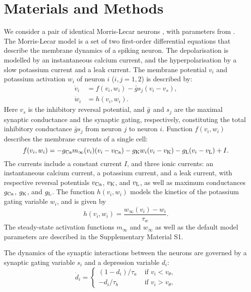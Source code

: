 \section{Materials and Methods}
We consider a pair of identical Morris-Lecar neurons \citep{morris1981}, with parameters from \cite{bose2011}.
The Morris-Lecar model is a set of two first-order differential equations that describe the membrane dynamics of a spiking neuron.
The depolarisation is modelled by an instantaneous calcium current, and the hyperpolarisation by a slow potassium current and a leak current.
The membrane potential $v_{i}$ and potassium activation $w_{i}$ of neuron $i$ ($i, j=1,2$) is described by:
\begin{align}
	\label{eq:cell-modelA}
	\dot v_{i} & = f(v_{i}, w_{i}) -\bar g s_j(v_i-v_{s}), \\
	\label{eq:cell-modelB}
	\dot w_{i} & =h(v_i,w_i).
\end{align}
Here $v_{s}$ is the inhibitory reversal potential, and $\bar g$ and $s_{j}$ are the maximal synaptic conductance and the synaptic gating, respectively, constituting the total inhibitory conductance $\bar g s_{j}$ from neuron $j$ to neuron $i$.
Function $f(v_{i}, w_{i})$ describes the membrane currents of a single cell:
\begin{equation}
	\label{eq:f}
	f(v_{i}, w_{i}) = -g_{\mathrm{Ca}}m_{\infty}(v_{i})(v_{i}-v_{\mathrm{Ca}}) - g_{\mathrm{K}}w_{i}(v_{i}-v_{\mathrm{K}})
	-g_{\mathrm{L}}(v_{i}-v_{\mathrm{L}}) + I.
\end{equation}
The currents include a constant current $I$, and three ionic currents: an instantaneous calcium current, a potassium current, and a leak current, with respective reversal
potentials $v_{\mathrm{Ca}}$, $v_{\mathrm{K}}$, and $v_{\mathrm{L}}$, as well as maximum conductances
$g_{\mathrm{Ca}}$, $g_{\mathrm{K}}$, and $g_{\mathrm{L}}$.  The function $h(v_{i}, w_{i})$ models the
kinetics of the potassium gating variable $w_{i}$, and is given by
\begin{equation}
	\label{eq:h}
	h(v_{i}, w_{i})=\frac{w_{\infty}(v_{i})-w_{i}}{\tau_{w}}.
\end{equation}
The steady-state activation functions $m_{\infty}$ and $w_{\infty}$ as well as the default model parameters are described in the Supplementary Material S1.

The dynamics of the synaptic interactions between the neurons are governed by a synaptic gating variable $s_{i}$ and a depression variable $d_{i}$:
\begin{equation}
	\label{eq:dot-d}
	\dot d_{i} = \begin{cases}
		(1-d_{i})/\tau_{a} & \text{ if } v_{i}<v_{\theta}, \\
		-d_{i}/\tau_{b}    & \text{ if } v_{i}>v_{\theta},
	\end{cases}
\end{equation}

